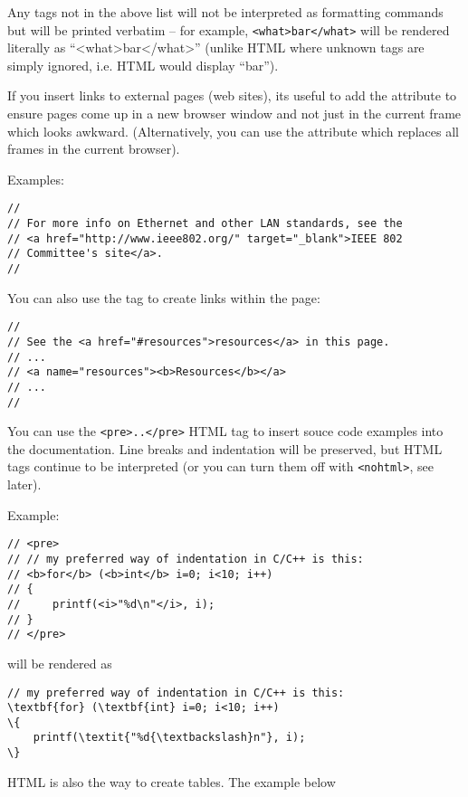 Any tags not in the above list will not be interpreted as formatting commands
but will be printed verbatim -- for example, \texttt{<what>bar</what>}
will be rendered literally as ``<what>bar</what>'' (unlike HTML where
unknown tags are simply ignored, i.e. HTML would display ``bar'').

If you insert links to external pages (web sites), its useful to add
the  attribute to ensure pages come up in a new
browser window and not just in the current frame which looks awkward.
(Alternatively, you can use the  attribute
which replaces all frames in the current browser).

Examples:

\begin{verbatim}
//
// For more info on Ethernet and other LAN standards, see the
// <a href="http://www.ieee802.org/" target="_blank">IEEE 802
// Committee's site</a>.
//
\end{verbatim}

You can also use the  tag to create links within the page:

\begin{verbatim}
//
// See the <a href="#resources">resources</a> in this page.
// ...
// <a name="resources"><b>Resources</b></a>
// ...
//
\end{verbatim}

You can use the \texttt{<pre>..</pre>} HTML tag to insert souce code examples
into the documentation. Line breaks and indentation will be preserved,
but HTML tags continue to be interpreted (or you can turn them off
with \texttt{<nohtml>}, see later).

Example:

\begin{verbatim}
// <pre>
// // my preferred way of indentation in C/C++ is this:
// <b>for</b> (<b>int</b> i=0; i<10; i++)
// {
//     printf(<i>"%d\n"</i>, i);
// }
// </pre>
\end{verbatim}

will be rendered as

\begin{Verbatim}[commandchars=\\\{\}]
// my preferred way of indentation in C/C++ is this:
\textbf{for} (\textbf{int} i=0; i<10; i++)
\{
    printf(\textit{"%d{\textbackslash}n"}, i);
\}
\end{Verbatim}

HTML is also the way to create tables. The example below

